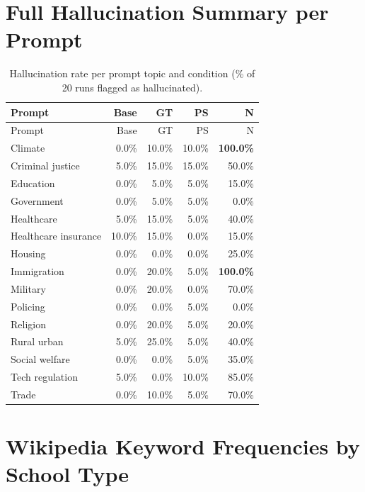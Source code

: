\documentclass{article}
\begin{document}
\section{Full Hallucination Summary per Prompt}

\begin{longtable}{l*{4}{r}}
  \caption{Hallucination rate per prompt topic and condition (\% of 20 runs flagged as hallucinated).} \label{tab:hallucination_per_prompt} \\
  \toprule
  Prompt & Base & GT & PS & N \\
  \midrule
  \endfirsthead
  \toprule
  Prompt & Base & GT & PS & N \\
  \midrule
  \endhead
  \bottomrule
  \endfoot
  Climate              & 0.0\%  & 10.0\% & 10.0\% & \textbf{100.0\%} \\
  Criminal justice     & 5.0\%  & 15.0\% & 15.0\% & 50.0\%           \\
  Education            & 0.0\%  & 5.0\%  & 5.0\%  & 15.0\%           \\
  Government           & 0.0\%  & 5.0\%  & 5.0\%  & 0.0\%            \\
  Healthcare           & 5.0\%  & 15.0\% & 5.0\%  & 40.0\%           \\
  Healthcare insurance & 10.0\% & 15.0\% & 0.0\%  & 15.0\%           \\
  Housing              & 0.0\%  & 0.0\%  & 0.0\%  & 25.0\%           \\
  Immigration          & 0.0\%  & 20.0\% & 5.0\%  & \textbf{100.0\%} \\
  Military             & 0.0\%  & 20.0\% & 0.0\%  & 70.0\%           \\
  Policing             & 0.0\%  & 0.0\%  & 5.0\%  & 0.0\%            \\
  Religion             & 0.0\%  & 20.0\% & 5.0\%  & 20.0\%           \\
  Rural urban          & 5.0\%  & 25.0\% & 5.0\%  & 40.0\%           \\
  Social welfare       & 0.0\%  & 0.0\%  & 5.0\%  & 35.0\%           \\
  Tech regulation      & 5.0\%  & 0.0\%  & 10.0\% & 85.0\%           \\
  Trade                & 0.0\%  & 10.0\% & 5.0\%  & 70.0\%           \\
\end{longtable}

\section{Wikipedia Keyword Frequencies by School Type}
\end{document}
